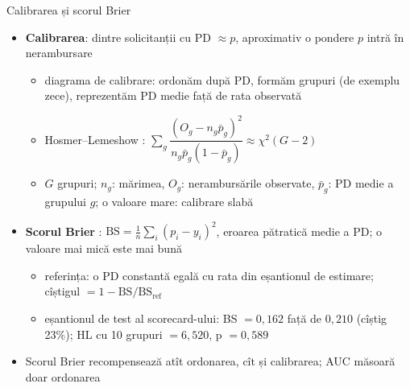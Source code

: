 \begin{frame}{Calibrarea și scorul Brier}
\itemsize{\small}
\begin{itemize}
    \item \textbf{Calibrarea}: dintre solicitanții cu PD $\approx p$, aproximativ o pondere $p$ intră în nerambursare
    \begin{itemize}
        \item diagrama de calibrare: ordonăm după PD, formăm grupuri (de exemplu zece), reprezentăm PD medie față de rata observată
        \item Hosmer--Lemeshow : $\sum_g \dfrac{(O_g - n_g\bar p_g)^2}{n_g\bar p_g(1 - \bar p_g)} \approx \chi^2(G - 2)$
        \item $G$ grupuri; $n_g$: mărimea, $O_g$: nerambursările observate, $\bar p_g$: PD medie a grupului $g$; o valoare mare: calibrare slabă
    \end{itemize}
    \item \textbf{Scorul Brier} : $\mathrm{BS} = \frac1n\sum_i (p_i - y_i)^2$, eroarea pătratică medie a PD; o valoare mai mică este mai bună
    \begin{itemize}
        \item referința: o PD constantă egală cu rata din eșantionul de estimare; cîștigul $= 1 - \mathrm{BS}/\mathrm{BS}_{\text{ref}}$
        \item eșantionul de test al scorecard-ului: BS $= 0{,}162$ față de $0{,}210$ (cîștig 23\%); HL cu 10 grupuri $= 6{,}520$, p $= 0{,}589$
    \end{itemize}
    \item Scorul Brier recompensează atît ordonarea, cît și calibrarea; AUC măsoară doar ordonarea
\end{itemize}
\end{frame}

